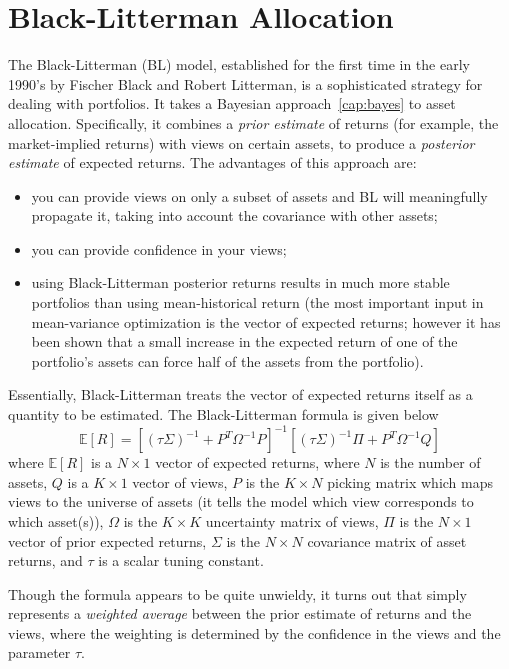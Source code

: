 \section{Black-Litterman Allocation}
\label{sec:black-litterman}
The Black-Litterman (BL) model, established for the first time in the early 1990’s by Fischer Black and Robert Litterman, is a sophisticated strategy for dealing with portfolios. It takes a Bayesian approach~\ref{cap:bayes} to asset allocation. Specifically, it combines a \emph{prior estimate} of returns (for example, the market-implied returns) with views on certain assets, to produce a \emph{posterior estimate} of expected returns. The advantages of this approach are:
\begin{itemize}
\item you can provide views on only a subset of assets and BL will meaningfully propagate it, taking into account the covariance with other assets;
\item you can provide confidence in your views;
\item using Black-Litterman posterior returns results in much more stable portfolios than using mean-historical return (the most important input in mean-variance optimization is the vector of expected returns; however it has been shown that a small increase in the expected return of one of the portfolio's assets can force half of the assets from the portfolio).
\end{itemize}

Essentially, Black-Litterman treats the vector of expected returns itself as a quantity to be estimated. The Black-Litterman formula is given below
\begin{equation}
  \mathbb{E}[R] = [(\tau\Sigma)^{-1}+P^T\Omega^{-1}P]^{-1}[(\tau\Sigma)^{-1}\Pi + P^T\Omega^{-1}Q]
  \label{eq:bl_formula}
\end{equation}
where $\mathbb{E}[R]$ is a $N\times1$ vector of expected returns, where $N$ is the number of assets, $Q$ is a $K\times1$ vector of views, $P$ is the $K\times N$ picking matrix which maps views to the universe of assets (it tells the model which view corresponds to which asset(s)), $\Omega$ is the $K\times K$ uncertainty matrix of views, $\Pi$ is the $N\times 1$ vector of prior expected returns, $\Sigma$ is the $N\times N$ covariance matrix of asset returns, and $\tau$ is a scalar tuning constant.

Though the formula appears to be quite unwieldy, it turns out that simply represents a \emph{weighted average} between the prior estimate of returns and the views, where the weighting is determined by the confidence in the views and the parameter $\tau$.

